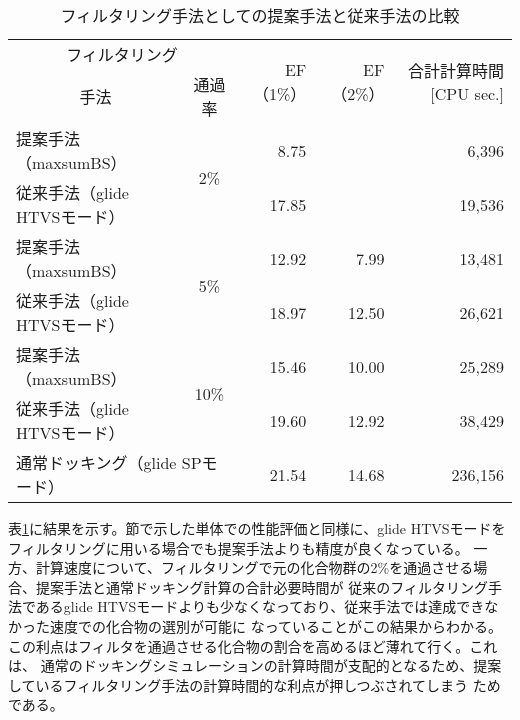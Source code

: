 \begin{table}[htb] \centering
	\caption{フィルタリング手法としての提案手法と従来手法の比較}
	\label{table:filtering_proposal}
	\begin{tabular}{lc|rr|r|}
	\multicolumn{2}{c|}{フィルタリング}					&\multirow{2}{*}{EF（1\%）}	&\multirow{2}{*}{EF（2\%）}	&\multirow{2}{*}{合計計算時間 [CPU sec.]}	\\
	\multicolumn{1}{c}{手法}		&通過率				&						&						&									\\ \hline
	提案手法（maxsumBS）		&\multirow{2}{*}{2\%}	&8.75					&\textendash				&6,396								\\
	従来手法（glide HTVSモード）	&					&17.85					&\textendash				&19,536								\\
	提案手法（maxsumBS）		&\multirow{2}{*}{5\%}	&12.92					&7.99					&13,481								\\
	従来手法（glide HTVSモード）	&					&18.97					&12.50					&26,621								\\
	提案手法（maxsumBS）		&\multirow{2}{*}{10\%}	&15.46					&10.00					&25,289								\\
	従来手法（glide HTVSモード）	&					&19.60					&12.92					&38,429								\\ \hline
	\multicolumn{2}{l|}{通常ドッキング（glide SPモード）}	&21.54					&14.68					&236,156								\\ \hline
	\end{tabular}
\end{table}

表\ref{table:filtering_proposal}に結果を示す。\label{subsec:single_accuracy}節で示した単体での性能評価と同様に、glide HTVSモードを
フィルタリングに用いる場合でも提案手法よりも精度が良くなっている。
一方、計算速度について、フィルタリングで元の化合物群の2\%を通過させる場合、提案手法と通常ドッキング計算の合計必要時間が
従来のフィルタリング手法であるglide HTVSモードよりも少なくなっており、従来手法では達成できなかった速度での化合物の選別が可能に
なっていることがこの結果からわかる。この利点はフィルタを通過させる化合物の割合を高めるほど薄れて行く。これは、
通常のドッキングシミュレーションの計算時間が支配的となるため、提案しているフィルタリング手法の計算時間的な利点が押しつぶされてしまう
ためである。